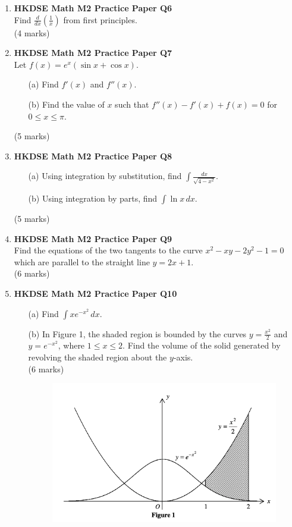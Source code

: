 \documentclass{report}
\begin{document}
\begin{enumerate}
	\item \textbf{HKDSE Math M2 Practice Paper Q6}\\
	Find $\displaystyle\frac{d}{dx}\left(\frac{1}{x}\right)$ from first principles. \\(4 marks)

	\item \textbf{HKDSE Math M2 Practice Paper Q7}\\
	Let $f(x) = e^x(\sin{x} + \cos{x})$. 
	\begin{enumerate}
		\item[(a)]Find $f'(x)$ and $f''(x)$. 
		\item[(b)]Find the value of $x$ such that $f''(x) - f'(x) + f(x) = 0$ for $0 \leq x \leq \pi$.
	\end{enumerate}
	(5 marks)

	\newpage

	\item \textbf{HKDSE Math M2 Practice Paper Q8}
	\begin{enumerate}
		\item [(a)]Using integration by substitution, find $\displaystyle\int\frac{dx}{\sqrt{4-x^2}}$. 
		\item [(b)]Using integration by parts, find $\displaystyle\int\ln{x}\,dx$.
	\end{enumerate}
	(5 marks)

	\item \textbf{HKDSE Math M2 Practice Paper Q9}\\
	Find the equations of the two tangents to the curve $x^2 - xy -2y^2 -1 =0$ which are parallel to the straight line $y = 2x+1$. \\(6 marks)

	\item \textbf{HKDSE Math M2 Practice Paper Q10}
	\begin{enumerate}
		\item [(a)]Find $\displaystyle\int xe^{-x^2} \,dx$. 
		\item [(b)]In Figure 1, the shaded region is bounded by the curves $y = \displaystyle\frac{x^2}{2}$ and $y = e^{-x^2}$, where $1 \leq x \leq 2$. Find the volume of the solid generated by revolving the shaded region about the $y$-axis.\\
	(6 marks)
		\begin{figure}[H]
			\centering
			\includegraphics[width = .5\linewidth]{PPFigure1}
		\end{figure}
	\end{enumerate}


\end{enumerate}
\end{document}

